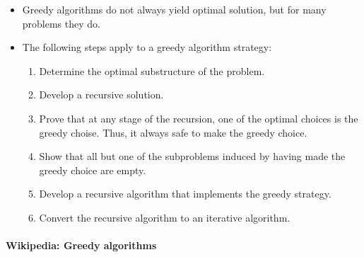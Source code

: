 \documentclass[a4paper,11pt]{article}
\begin{document}
\begin{itemize}
\itemsep1pt\parskip0pt
\item
  Greedy algorithms do not always yield optimal solution, but for many
  problems they do.
\item
  The following steps apply to a greedy algorithm strategy:

  \begin{enumerate}
  \def\labelenumi{\arabic{enumi}.}
  \itemsep1pt\parskip0pt
  \item
    Determine the optimal substructure of the problem.
  \item
    Develop a recursive solution.
  \item
    Prove that at any stage of the recursion, one of the optimal choices
    is the greedy choise. Thus, it always safe to make the greedy
    choice.
  \item
    Show that all but one of the subproblems induced by having made the
    greedy choice are empty.
  \item
    Develop a recursive algorithm that implements the greedy strategy.
  \item
    Convert the recursive algorithm to an iterative algorithm.
  \end{enumerate}
\end{itemize}

\paragraph{Wikipedia: Greedy
algorithms}\label{wikipedia-greedy-algorithms}
\end{document}
